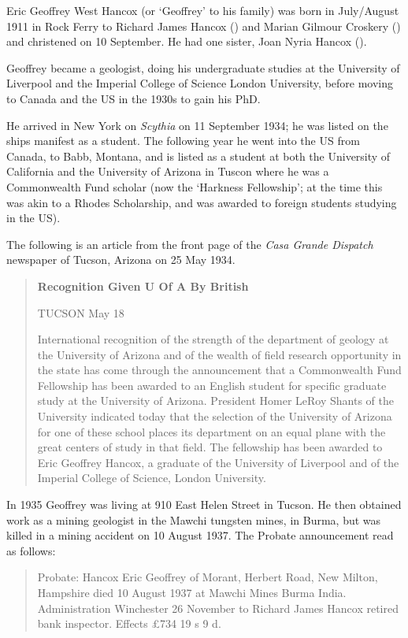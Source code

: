 
Eric Geoffrey West Hancox (or `Geoffrey' to his family) was  born in July/August 1911 in Rock Ferry\cite{EGWHbirth} to Richard James Hancox () and Marian Gilmour Croskery () and christened on 10 September.\cite{EGWHchristening} He had one sister, Joan Nyria Hancox ().

Geoffrey became a geologist, doing his undergraduate studies at the University of Liverpool and the Imperial College of Science London University, before moving to Canada and the US in the 1930s to gain his PhD.

He arrived in New York on \emph{Scythia} on 11 September 1934; he was listed on the ships manifest as a student.\cite{NYpassengers}
The following year he went into the US from Canada, to Babb, Montana, and is listed as a student at both the University of California and the University of Arizona in Tuscon\cite{USCanadaBorderCrossings} where he was a Commonwealth Fund scholar (now the `Harkness Fellowship'; at the time this was akin to a Rhodes Scholarship, and was awarded to foreign students studying in the US).

The following is an article from the front page of the \emph{Casa Grande Dispatch} newspaper of Tucson, Arizona on 25 May 1934.\cite{CasaP1}

\begin{quotation}
\textbf{Recognition Given U Of A By British}

TUCSON May 18

International recognition of the strength of the department of geology at the University of Arizona and of the wealth of field research opportunity in the state has come through the announcement that a Commonwealth Fund Fellowship has been awarded to an English student for specific graduate study at the University of Arizona. President Homer LeRoy Shants of the University indicated today that the selection of the University of Arizona for one of these school places its department on an equal plane with the great centers of study in that field. The fellowship has been awarded to Eric Geoffrey Hancox, a graduate of the University of Liverpool and of the Imperial College of Science, London University.
\end{quotation}

In 1935 Geoffrey was living at 910 East Helen Street in Tucson.\cite{USCities}
He then obtained work as a mining geologist in  the Mawchi tungsten mines, in Burma, but was killed in a mining accident on 10 August 1937.
The Probate announcement read as follows:\cite{NationalProbateCalendar}
\begin{quotation}
Probate: Hancox Eric Geoffrey of Morant, Herbert Road, New Milton, Hampshire died 10 August 1937 at Mawchi Mines Burma India. Administration Winchester 26 November to Richard James Hancox retired bank inspector. Effects \pounds734 19 s 9 d.
\end{quotation}

